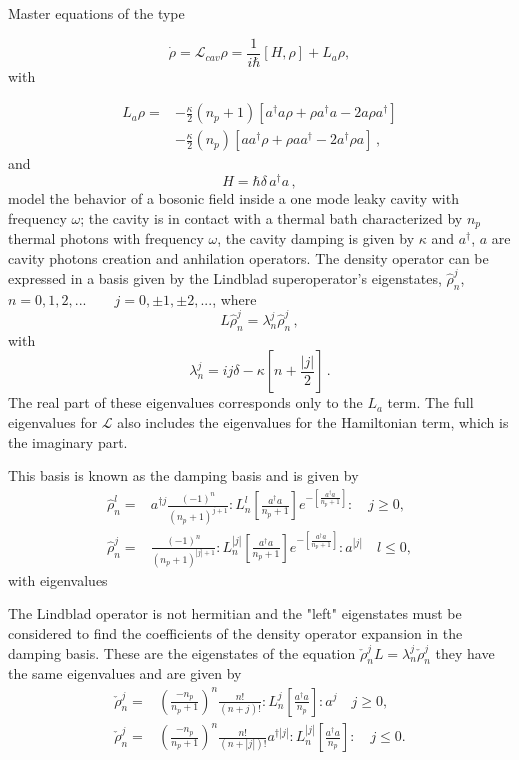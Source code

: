 \documentclass[reprint, amsmath,amssymb, aps,pra]{revtex4-1}
\begin{document}
Master equations of the type 

\begin{equation}
\dot{\rho} = \mathcal{L}_{cav} \rho = \frac{1}{i\hbar}[H,\rho]+L_a\rho, 
\end{equation} with

\begin{align}\label{EMField}
L_a \rho =& - \frac{\kappa}{2}(n_p+1)[a^\dagger a\rho + \rho a^\dagger a -2a\rho a^\dagger] \nonumber \\
 &- \frac{\kappa}{2}(n_p)[ aa^\dagger\rho + \rho  aa^\dagger -2a^\dagger\rho a]\, ,
\end{align}
and
\begin{equation}
  H=\hbar \delta \, a^\dagger a\, ,
\end{equation}
model the behavior of a bosonic field inside a one mode leaky cavity
with frequency $\omega$; the cavity is in contact with a thermal bath
characterized by $n_p$ thermal photons with frequency $\omega$, the
cavity damping is given by $\kappa$ \cite{EnglertDB} and $a^\dagger$,
$a$ are cavity photons creation and anhilation operators. The density
operator can be expressed in a basis given by the Lindblad
superoperator's eigenstates, ${\hat{\rho}_n^j}$,
$n=0,1,2,...\qquad j = 0,\pm 1, \pm 2,... $, where
\begin{equation}
L\hat{\rho}_n^j = \lambda_n^j\hat{\rho}_n^j\label{eq:eigen_damping}\, ,
\end{equation}
with
\begin{equation}
\lambda_n^j = ij\delta -\kappa[n + \frac{|j|}{2}]\, .
\end{equation} The real part of these eigenvalues corresponds only to the $L_a$ term. The full eigenvalues for $\mathcal{L}$  also includes the eigenvalues for the Hamiltonian term, which is the imaginary part.



This basis is known as the damping basis \cite{EnglertDB} and is given by
\begin{align}\label{DefDB}
\hat{\rho}_n^l=&a^{\dagger j}\frac{(-1)^n}{(n_p+1)^{j+1}}:L_n^l[\frac{a^\dagger a}{n_p+1}]e^{-[\frac{a^\dagger a}{n_p+1}]}:\quad j \geq 0, \\
\hat{\rho}_n^j=&\frac{(-1)^n}{(n_p+1)^{|j|+1}}:L_n^{|j|}[\frac{a^\dagger a}{n_p+1}]e^{-[\frac{a^\dagger a}{n_p+1}]}:a^{|j|}\quad l \leq 0,
\end{align} with eigenvalues

The Lindblad operator is not hermitian and the "left" eigenstates must
be considered to find the coefficients of the density operator
expansion in the damping basis. These are the eigenstates of the
equation $\check{\rho}_n^jL = \lambda_n^j\check{\rho}_n^j$ they have
the same eigenvalues and are given by
\begin{align}\label{DefDBDual}
\check{\rho}_n^j=&(\frac{-n_p}{n_p+1})^n\frac{n!}{(n+j)!}:L_n^j[\frac{a^\dagger a}{n_p}]:a^{j}\quad j \geq 0, \\
\check{\rho}_n^j=&(\frac{-n_p}{n_p+1})^n\frac{n!}{(n+|j|)!}a^{\dagger|j|}:L_n^{|j|}[\frac{a^\dagger a}{n_p}]:\quad j \leq 0.
\end{align}
\end{document}
